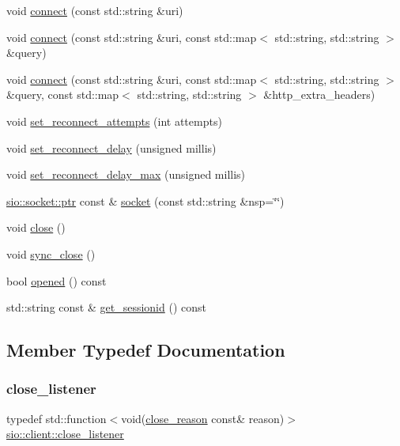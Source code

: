 \begin{DoxyCompactItemize}
void \hyperlink{classsio_1_1client_a0e2cf12e2ededbc00ae1de22768c22ac}{connect} (const std\+::string \&uri)
\item 
void \hyperlink{classsio_1_1client_a3867f1379415ed97bd47a3d53458c273}{connect} (const std\+::string \&uri, const std\+::map$<$ std\+::string, std\+::string $>$ \&query)
\item 
void \hyperlink{classsio_1_1client_a9390bffe820269a81493f606e949b2b9}{connect} (const std\+::string \&uri, const std\+::map$<$ std\+::string, std\+::string $>$ \&query, const std\+::map$<$ std\+::string, std\+::string $>$ \&http\+\_\+extra\+\_\+headers)
\item 
void \hyperlink{classsio_1_1client_a42ae73ea487b59582742d914d3d93e05}{set\+\_\+reconnect\+\_\+attempts} (int attempts)
\item 
void \hyperlink{classsio_1_1client_a50da06327e202468a47e24c8b71d6864}{set\+\_\+reconnect\+\_\+delay} (unsigned millis)
\item 
void \hyperlink{classsio_1_1client_ab1339410ffe0ac1f7bf61236dafc5648}{set\+\_\+reconnect\+\_\+delay\+\_\+max} (unsigned millis)
\item 
\hyperlink{classsio_1_1socket_afb4f5829acfc5c8181ddb7174c501593}{sio\+::socket\+::ptr} const  \& \hyperlink{classsio_1_1client_a53459c95c2cd1c99ee7e6eec3181b947}{socket} (const std\+::string \&nsp=\char`\"{}\char`\"{})
\item 
void \hyperlink{classsio_1_1client_a1c36b90b0425246f74564e90f5263066}{close} ()
\item 
void \hyperlink{classsio_1_1client_a68787f325fdf4378b992329b123cde9d}{sync\+\_\+close} ()
\item 
bool \hyperlink{classsio_1_1client_afc1eb2298634f626d24e5fb0909ecb60}{opened} () const
\item 
std\+::string const  \& \hyperlink{classsio_1_1client_a3ff97f72d86f9fcad11bde729ac9d1b4}{get\+\_\+sessionid} () const
\end{DoxyCompactItemize}


\subsection{Member Typedef Documentation}
\mbox{\label{classsio_1_1client_a9736334c566e7dcc6201ea5629024390}} 
\subsubsection{\texorpdfstring{close\+\_\+listener}{close\_listener}}
{\footnotesize\ttfamily typedef std\+::function$<$void(\hyperlink{classsio_1_1client_a5c8b6c424134f40b3e9bf488b4961aaf}{close\+\_\+reason} const\& reason)$>$ \hyperlink{classsio_1_1client_a9736334c566e7dcc6201ea5629024390}{sio\+::client\+::close\+\_\+listener}}

